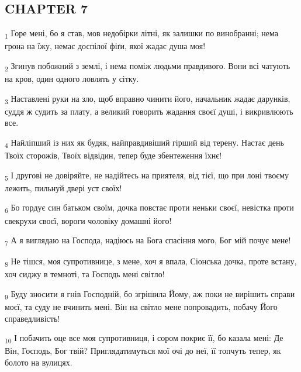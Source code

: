 \subsection{CHAPTER 7}
\begin{tcolorbox}
\textsubscript{1} Горе мені, бо я став, мов недобірки літні, як залишки по винобранні; нема грона на їжу, немає доспілої фіґи, якої жадає душа моя!
\end{tcolorbox}
\begin{tcolorbox}
\textsubscript{2} Згинув побожний з землі, і нема поміж людьми правдивого. Вони всі чатують на кров, один одного ловлять у сітку.
\end{tcolorbox}
\begin{tcolorbox}
\textsubscript{3} Наставлені руки на зло, щоб вправно чинити його, начальник жадає дарунків, суддя ж судить за плату, а великий говорить жадання своєї душі, і викривлюють все.
\end{tcolorbox}
\begin{tcolorbox}
\textsubscript{4} Найліпший із них як будяк, найправдивіший гірший від терену. Настає день Твоїх сторожів, Твоїх відвідин, тепер буде збентеження їхнє!
\end{tcolorbox}
\begin{tcolorbox}
\textsubscript{5} І другові не довіряйте, не надійтесь на приятеля, від тієї, що при лоні твоєму лежить, пильнуй двері уст своїх!
\end{tcolorbox}
\begin{tcolorbox}
\textsubscript{6} Бо гордує син батьком своїм, дочка повстає проти неньки своєї, невістка проти свекрухи своєї, вороги чоловіку домашні його!
\end{tcolorbox}
\begin{tcolorbox}
\textsubscript{7} А я виглядаю на Господа, надіюсь на Бога спасіння мого, Бог мій почує мене!
\end{tcolorbox}
\begin{tcolorbox}
\textsubscript{8} Не тішся, моя супротивнице, з мене, хоч я впала, Сіонська дочка, проте встану, хоч сиджу в темноті, та Господь мені світло!
\end{tcolorbox}
\begin{tcolorbox}
\textsubscript{9} Буду зносити я гнів Господній, бо згрішила Йому, аж поки не вирішить справи моєї, та суду не вчинить мені. Він на світло мене попровадить, побачу Його справедливість!
\end{tcolorbox}
\begin{tcolorbox}
\textsubscript{10} І побачить оце все моя супротивниця, і сором покриє її, бо казала мені: Де Він, Господь, Бог твій? Приглядатимуться мої очі до неї, її топчуть тепер, як болото на вулицях.
\end{tcolorbox}
